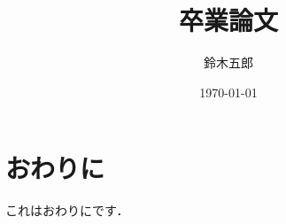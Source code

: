 \documentclass[a4j,twoside]{jarticle}
\title{卒業論文}
\author{鈴木五郎}
\date{\today}
\begin{document}
\maketitle





\section{おわりに}

これはおわりにです．
\end{document}
